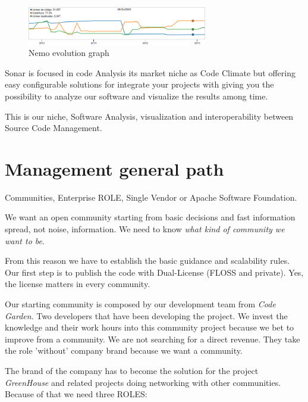 \documentclass[11pt]{scrartcl}
\begin{document}
\begin{figure}[H]
\centering
\includegraphics[width=0.7\textwidth]{nemo-evolution.png}
\caption{Nemo evolution graph}
\label{nemo-evolution}
\end{figure}

\par Sonar is focused in code Analysis its market niche as Code Climate but offering easy configurable solutions for integrate your projects with giving you the possibility to analyze our software and visualize the results among time.

\par This is our niche, Software Analysis, visualization and interoperability between Source Code Management.


\section{Management general path}
\label{sec:management-path}

\par Communities, Enterprise ROLE, Single Vendor or Apache Software Foundation.

\par We want an open community starting from basic decisions and fast information spread, not noise, information. We need to know \emph{what kind of community we want to be}.

\par From this reason we have to establish the basic guidance and scalability rules. Our first step is to publish the code with Dual-License (FLOSS and private). Yes, the license matters in every community.

\par Our starting community is composed by our development team from \emph{Code Garden}. Two developers that have been developing the project. We invest the knowledge and their work hours into this community project because we bet to improve from a community. We are not searching for a direct revenue. They take the role 'without' company brand because we want a community. 

\par The brand of the company has to become the solution for the project \emph{GreenHouse} and related projects doing networking with other communities. Because of that we need three ROLES:
\end{document}
